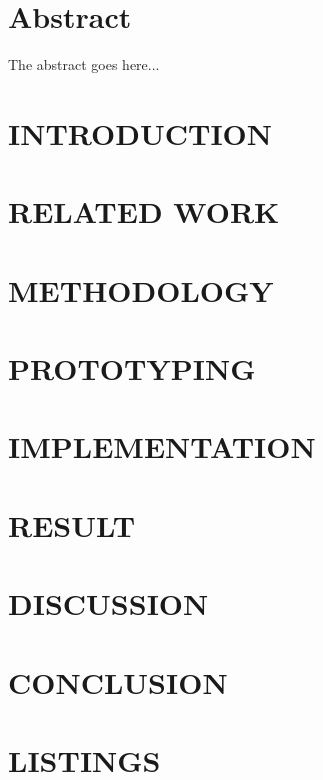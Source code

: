 \documentclass[12pt, twoside]{report}
\makeatletter
\newcommand\AppendixName{Appendix}
\let\oldappendix\appendix
\renewcommand{\appendix}{%
  \oldappendix
  \renewcommand{\chaptername}{\AppendixName}  \renewcommand{\thechapter}{\@Alph\c@chapter}}
\makeatother
\begin{document}
\tableofcontents
\listoftables
{}
\listoffigures
{}
\listofalgorithms
{}
\lstlistoflistings
{}

\chapter*{Abstract}
The abstract goes here...

\chapter{INTRODUCTION}
\setcounter{page}{1}


\chapter{RELATED WORK}


\chapter{METHODOLOGY}


\chapter{PROTOTYPING}


\chapter{IMPLEMENTATION}

	
\chapter{RESULT}

	
\chapter{DISCUSSION}

	
\chapter{CONCLUSION}





\appendix
\chapter{LISTINGS}

\end{document}
